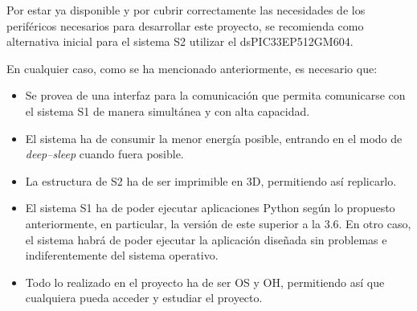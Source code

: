 Por estar ya disponible y por cubrir correctamente las necesidades de los periféricos
necesarios para desarrollar este proyecto, se recomienda como alternativa inicial para
el sistema \ac{S2} utilizar el dsPIC33EP512GM604.

En cualquier caso, como se ha mencionado anteriormente, es necesario que:

\begin{itemize}
    \item Se provea de una interfaz para la comunicación que permita comunicarse con el sistema \ac{S1} de manera simultánea y con alta capacidad.
    \item El sistema ha de consumir la menor energía posible, entrando en el modo de \textit{deep--sleep} cuando fuera posible.
    \item La estructura de \ac{S2} ha de ser imprimible en 3D, permitiendo así replicarlo.
    \item El sistema \ac{S1} ha de poder ejecutar aplicaciones Python según lo propuesto anteriormente, en particular, la versión de este superior a la 3.6. En otro caso, el sistema habrá de poder ejecutar la aplicación diseñada sin problemas e indiferentemente del sistema operativo.
    \item Todo lo realizado en el proyecto ha de ser \ac{OS} y \ac{OH}, permitiendo así que cualquiera pueda acceder y estudiar el proyecto.
\end{itemize}